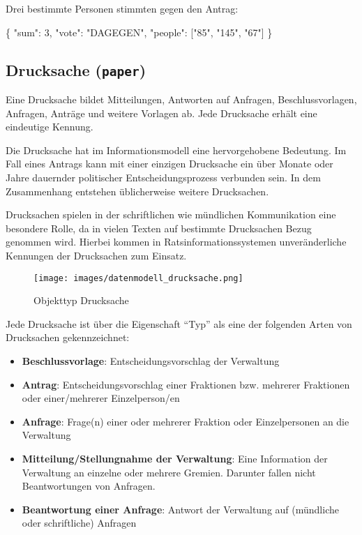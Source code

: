 \documentclass[,a4paper]{article}
\makeatletter
\newenvironment{Shaded}{}{}
\newcommand{\DataTypeTok}[1]{\textcolor[rgb]{0.56,0.13,0.00}{{#1}}}
\newcommand{\DecValTok}[1]{\textcolor[rgb]{0.25,0.63,0.44}{{#1}}}
\newcommand{\StringTok}[1]{\textcolor[rgb]{0.25,0.44,0.63}{{#1}}}
\newcommand{\NormalTok}[1]{{#1}}
\def\maxwidth{\ifdim\Gin@nat@width>\linewidth\linewidth
\else\Gin@nat@width\fi}
\let\Oldincludegraphics\includegraphics
\renewcommand{\includegraphics}[1]{\Oldincludegraphics[width=\maxwidth]{#1}}
\makeatother
\begin{document}
Drei bestimmte Personen stimmten gegen den Antrag:

\begin{Shaded}
\begin{Highlighting}[]
\NormalTok{\{}
    \DataTypeTok{"sum"}\NormalTok{: }\DecValTok{3}\NormalTok{,}
    \DataTypeTok{"vote"}\NormalTok{: }\StringTok{"DAGEGEN"}\NormalTok{,}
    \DataTypeTok{"people"}\NormalTok{: [}\StringTok{"85"}\NormalTok{, }\StringTok{"145"}\NormalTok{, }\StringTok{"67"}\NormalTok{]}
\NormalTok{\}}
\end{Highlighting}
\end{Shaded}

\subsection{Drucksache (\texttt{paper})}

Eine Drucksache bildet Mitteilungen, Antworten auf Anfragen,
Beschlussvorlagen, Anfragen, Anträge und weitere Vorlagen ab. Jede
Drucksache erhält eine eindeutige Kennung.

Die Drucksache hat im Informationsmodell eine hervorgehobene Bedeutung.
Im Fall eines Antrags kann mit einer einzigen Drucksache ein über Monate
oder Jahre dauernder politischer Entscheidungsprozess verbunden sein. In
dem Zusammenhang entstehen üblicherweise weitere Drucksachen.

Drucksachen spielen in der schriftlichen wie mündlichen Kommunikation
eine besondere Rolle, da in vielen Texten auf bestimmte Drucksachen
Bezug genommen wird. Hierbei kommen in Ratsinformationssystemen
unveränderliche Kennungen der Drucksachen zum Einsatz.

\begin{figure}[htbp]
\centering
\texttt{[image: images/datenmodell\_drucksache.png]}
\caption{Objekttyp Drucksache}
\end{figure}

Jede Drucksache ist über die Eigenschaft ``Typ'' als eine der folgenden
Arten von Drucksachen gekennzeichnet:

\begin{itemize}
\item
  \textbf{Beschlussvorlage}: Entscheidungsvorschlag der Verwaltung
\item
  \textbf{Antrag}: Entscheidungsvorschlag einer Fraktionen bzw. mehrerer
  Fraktionen oder einer/mehrerer Einzelperson/en
\item
  \textbf{Anfrage}: Frage(n) einer oder mehrerer Fraktion oder
  Einzelpersonen an die Verwaltung
\item
  \textbf{Mitteilung/Stellungnahme der Verwaltung}: Eine Information der
  Verwaltung an einzelne oder mehrere Gremien. Darunter fallen nicht
  Beantwortungen von Anfragen.
\item
  \textbf{Beantwortung einer Anfrage}: Antwort der Verwaltung auf
  (mündliche oder schriftliche) Anfragen
\end{itemize}
\end{document}

